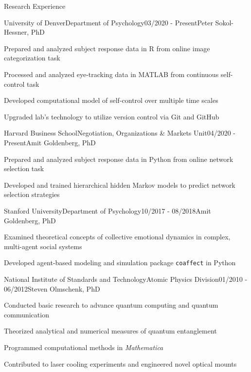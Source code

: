 \documentclass{cv} %
\begin{document}
\begin{cvSection}{Research Experience}

\begin{cvSubsectionResearch}{University of Denver}{Department of Psychology}{03/2020 - Present}{Peter Sokol-Hessner, PhD}
\item Prepared and analyzed subject response data in R from online image categorization task
\item Processed and analyzed eye-tracking data in MATLAB from continuous self-control task
\item Developed computational model of self-control over multiple time scales
\item Upgraded lab's technology to utilize version control via Git and GitHub
\end{cvSubsectionResearch}



\begin{cvSubsectionResearch}
{Harvard Business School}{Negotiation, Organizations \& Markets Unit}{04/2020 - Present}{Amit Goldenberg, PhD}
\item Prepared and analyzed subject response data in Python from online network selection task
\item Developed and trained hierarchical hidden Markov models to predict network selection strategies
\end{cvSubsectionResearch}


\begin{cvSubsectionResearch}{Stanford University}{Department of Psychology}{10/2017 - 08/2018}{Amit Goldenberg, PhD}
\item Examined theoretical concepts of collective emotional dynamics in complex, multi-agent social systems
\item Developed agent-based modeling and simulation package \texttt{coaffect} in Python
\end{cvSubsectionResearch}


\begin{cvSubsectionResearch}{National Institute of Standards and Technology}{Atomic Physics Division}{01/2010 - 06/2012}{Steven Olmschenk, PhD}
\item Conducted basic research to advance quantum computing and quantum communication
\item Theorized analytical and numerical measures of quantum entanglement
\item Programmed computational methods in \textit{Mathematica}
\item Contributed to laser cooling experiments and engineered novel optical mounts
\end{cvSubsectionResearch}

\end{cvSection}
\end{document}
